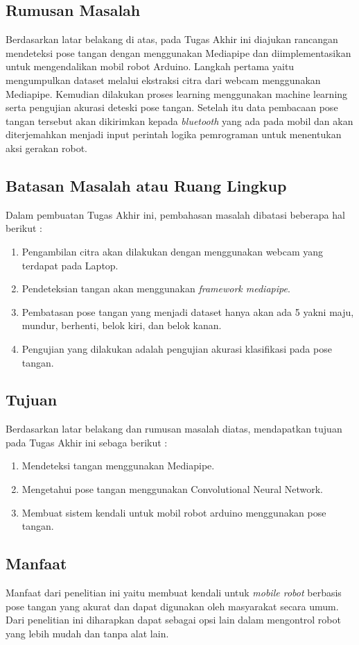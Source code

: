 \subsection{Rumusan Masalah}
Berdasarkan latar belakang di atas, pada Tugas Akhir ini diajukan rancangan mendeteksi pose tangan dengan menggunakan Mediapipe dan diimplementasikan untuk mengendalikan mobil robot Arduino. Langkah pertama yaitu mengumpulkan dataset melalui ekstraksi citra dari webcam menggunakan Mediapipe. Kemudian dilakukan proses learning menggunakan machine learning serta pengujian akurasi deteski pose tangan. Setelah itu data pembacaan pose tangan tersebut akan dikirimkan kepada \textit{bluetooth} yang ada pada mobil dan akan diterjemahkan menjadi input perintah logika pemrograman untuk menentukan aksi gerakan robot.

\subsection{Batasan Masalah atau Ruang Lingkup}

Dalam pembuatan Tugas Akhir ini, pembahasan masalah dibatasi beberapa hal berikut :
\begin{enumerate}
	\item Pengambilan citra akan dilakukan dengan menggunakan webcam yang terdapat pada Laptop.
	\item Pendeteksian tangan akan menggunakan \textit{framework mediapipe}.
	\item Pembatasan pose tangan yang menjadi dataset hanya akan ada 5 yakni maju, mundur, berhenti, belok kiri, dan belok kanan.
	\item Pengujian yang dilakukan adalah pengujian akurasi klasifikasi pada pose tangan.
\end{enumerate}

\subsection{Tujuan}

Berdasarkan latar belakang dan rumusan masalah diatas, mendapatkan tujuan pada Tugas Akhir ini sebaga berikut :
\begin{enumerate}
	\item Mendeteksi tangan menggunakan Mediapipe.
	\item Mengetahui pose tangan menggunakan Convolutional Neural Network.
	\item Membuat sistem kendali untuk mobil robot arduino menggunakan pose tangan.
\end{enumerate}

\subsection{Manfaat}
Manfaat dari penelitian ini yaitu membuat kendali untuk \textit{mobile robot} berbasis pose tangan yang akurat dan dapat digunakan oleh masyarakat secara umum. Dari penelitian ini diharapkan dapat sebagai opsi lain dalam mengontrol robot yang lebih mudah dan tanpa alat lain.
